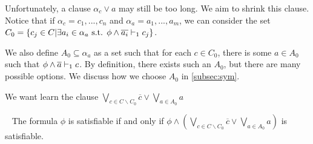 Unfortunately, a clause $\alpha_c \lor a$ may still be too long. We aim to
shrink this clause. Notice that if $\alpha_c = c_1, ..., c_n$ and $\alpha_a =
a_1, ..., a_m$, we can consider the set $C_0 = \{c_j \in C| \exists a_i \in
\alpha_a \text{ s.t. } \phi \land \overline{a_i} \vdash_1 c_j \}$.







We also define $A_0 \subseteq \alpha_a$ as a set such that for each $c \in C_0$,
there is some $a \in A_0$ such that $\phi \land \overline{a} \vdash_1 c$. By definition,
there exists such an $A_0$, but there are many possible options. We discuss how
we choose $A_0$ in \autoref{subsec:sym}.



We want learn the clause $\bigvee_{c \in C \backslash C_0} \overline{c} \lor
\bigvee_{a \in A_0} a$


\begin{theorem}~\label{thm:shrunkgbcequisat}
    The formula $\phi$ is satisfiable if and only if $\phi \land (\bigvee_{c \in C \backslash C_0} \overline{c} \lor \bigvee_{a \in A_0} a)$ is satisfiable.
\end{theorem}

